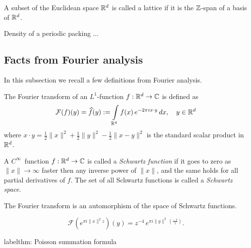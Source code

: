 \begin{definition}\label{EuclideanLattice.is_lattice}\leanok
  A subset of the Euclidean space $\mathbb{R}^d$ is called a lattice if it is the $\mathbb{Z}$-span of a basis of $\mathbb{R}^d$.
\end{definition}

\begin{lemma} Density of a periodic packing ...
\end{lemma}
\subsection{Facts from Fourier analysis}

In this subsection we recall a few definitions from Fourier analysis.
\begin{definition}\label{def: Fourier Transform definition}
The Fourier transform of an $L^1$-function $f:\mathbb{R}^d\to\mathbb{C}$ is defined as
$$\mathcal{F}(f)(y)=\widehat{f}(y):=\int\limits_{\mathbb{R}^d} f(x)\,e^{-2\pi i x\cdot y}\,dx,\quad y\in\mathbb{R}^d $$
where $x\cdot y=\frac12\|x\|^2+\frac12\|y\|^2-\frac12\|x-y\|^2$ is the standard scalar product in $\mathbb{R}^d$.
\end{definition}
\begin{definition}
A $C^\infty$~function $f:\mathbb{R}^d\to\mathbb{C}$ is called a \emph{Schwartz function} if it goes to zero as $\|x\|\to\infty$ faster then any inverse power of $\|x\|$, and the same holds for all partial derivatives of $f$. The set of all Schwartz functions is called a \emph{Schwartz space}.
\end{definition}
\begin{lemma}The Fourier transform is an automorphism of the space of Schwartz functions.\end{lemma}
\begin{lemma}\label{lemma: Gaussian Fourier}
\begin{equation}\mathcal{F}(e^{\pi i  \|x\|^2 z})(y)=z^{-4}\,e^{\pi i \|y\|^2 \,(\frac{-1}{z}) }.\end{equation}
\end{lemma}
\begin{theorem}label{thm: Poisson summation formula}
\end{theorem}

